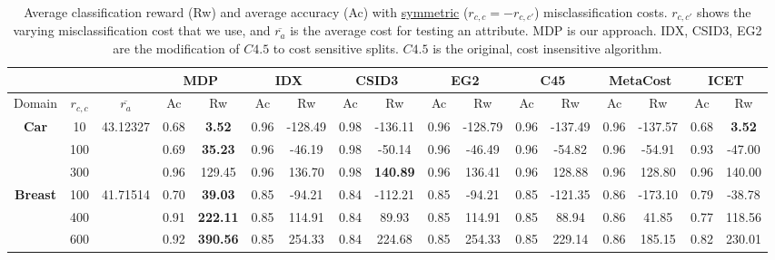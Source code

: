 \documentclass[letterpaper]{article}
\theoremstyle{definition}
\begin{document}
\begin{table}[t]
\centering
\scriptsize
\caption{Average classification reward (Rw) and average accuracy (Ac) with \underline{symmetric} ($r_{c,c}=-r_{c,c'}$) misclassification costs. $r_{c,c'}$ shows the varying misclassification cost that we use, and $\overline{r_a}$ is the average cost for testing an attribute. MDP is our approach. IDX, CSID3, EG2 are the modification of $C4.5$ to cost sensitive splits. $C4.5$ is the original, cost insensitive algorithm.}
\label{tbl:symmetric}
\begin{tabular}{|c|c|c|c|c|c|c|c|c|c|c|c|c|c|c|c|c|}
\hline
&&& \multicolumn{2}{c|}{MDP}     & \multicolumn{2}{c|}{IDX} & \multicolumn{2}{c|}{CSID3}   & \multicolumn{2}{c|}{EG2} & \multicolumn{2}{c|}{C45}    & \multicolumn{2}{c|}{MetaCost} & \multicolumn{2}{c|}{ICET}    \\ \hline
Domain&$r_{c,c}$&$\overline{r_a}$&Ac&Rw&Ac&Rw&Ac&Rw&Ac&Rw&Ac&Rw&Ac&Rw&Ac&Rw \\ \hline

\multirow{3}{*}{\textbf{Car}}       & 10       & 43.12327 & 0.68  & \textbf{3.52}    & 0.96  & -128.49          & 0.98   & -136.11           & 0.96      & -128.79      & 0.96  & -137.49          & 0.96     & -137.57            & 0.68   & \textbf{3.52}    \\ \cline{2-17} 
                                    & 100      &          & 0.69  & \textbf{35.23}   & 0.96  & -46.19           & 0.98   & -50.14            & 0.96      & -46.49       & 0.96  & -54.82           & 0.96     & -54.91             & 0.93   & -47.00           \\ \cline{2-17} 
                                    & 300      &          & 0.96  & 129.45           & 0.96  & 136.70           & 0.98   & \textbf{140.89}   & 0.96      & 136.41       & 0.96  & 128.88           & 0.96     & 128.80             & 0.96   & 140.00           \\ \hline
\multirow{3}{*}{\textbf{Breast}}    & 100      & 41.71514 & 0.70  & \textbf{39.03}   & 0.85      & -94.21       & 0.84   & -112.21           & 0.85      & -94.21       & 0.85      & -121.35      & 0.86         & -173.10        & 0.79   & -38.78           \\ \cline{2-17} 
                                    & 400      &          & 0.91  & \textbf{222.11}  & 0.85      & 114.91       & 0.84   & 89.93             & 0.85      & 114.91       & 0.85      & 88.94        & 0.86         & 41.85          & 0.77   & 118.56           \\ \cline{2-17} 
                                    & 600      &          & 0.92  & \textbf{390.56}  & 0.85      & 254.33       & 0.84   & 224.68            & 0.85      & 254.33       & 0.85      & 229.14       & 0.86         & 185.15         & 0.82   & 230.01           \\ \hline


\end{tabular}
\end{table}
\end{document}
